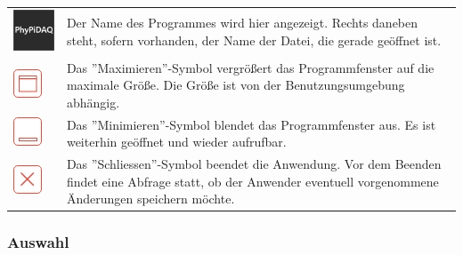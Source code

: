 \documentclass[parskip=full]{scrartcl}
\begin{document}
\begin{tabular}[t]{p{1cm} p{10cm}}
	\vspace{0cm}\includegraphics[width = 1 cm]{Grafik/PhyPiDAQ.jpg} & Der Name des Programmes wird hier angezeigt. Rechts daneben steht, sofern vorhanden, der Name der Datei, die gerade geöffnet ist.\newline\\
	\vspace{0cm}\includegraphics[width = 1 cm]{Grafik/Maximieren.jpg} & Das ''Maximieren''-Symbol vergrößert das Programmfenster auf die maximale Größe. Die Größe ist von der Benutzungsumgebung abhängig.\newline\\
	\vspace{0cm}\includegraphics[width = 1 cm]{Grafik/Minimieren.jpg} & Das ''Minimieren''-Symbol blendet das Programmfenster aus. Es ist weiterhin geöffnet und wieder aufrufbar. \\
	\vspace{0cm}\includegraphics[width = 1 cm]{Grafik/Schliessen.jpg} & Das ''Schliessen''-Symbol beendet die Anwendung. Vor dem Beenden findet eine Abfrage statt, ob der Anwender eventuell vorgenommene Änderungen speichern möchte.\newline\\
\end{tabular}

\subsubsection{Auswahl}
\end{document}
